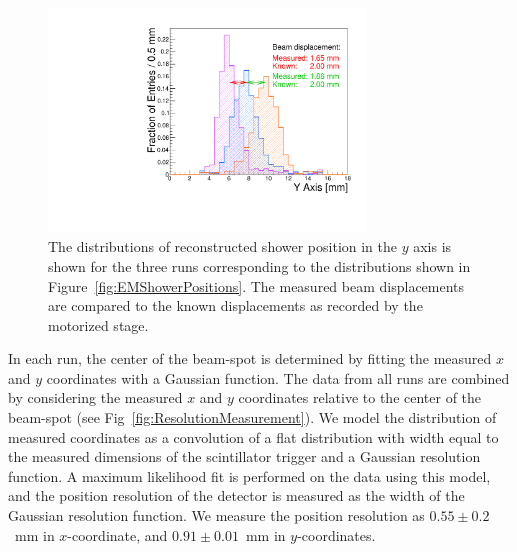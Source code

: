 \begin{figure}[h]
\includegraphics[width=0.75\textwidth]{Images/centers/superimposed.pdf}
\caption{The distributions of reconstructed shower position in the $y$ axis is
shown for the three runs corresponding to the distributions shown in
Figure~\ref{fig:EMShowerPositions}. The measured beam displacements are compared
to the known displacements as recorded by the motorized stage. }
\label{fig:EMShowerYPositionComparison} 
\end{figure} 
In each run, the center of the beam-spot is determined by fitting the measured
$x$ and $y$ coordinates with a Gaussian function. The data from all runs are
combined by considering the measured $x$ and $y$ coordinates relative to the
center of the beam-spot (see Fig~\ref{fig:ResolutionMeasurement}). We model the
distribution of measured coordinates as a convolution of a flat distribution
with width equal to the measured dimensions of the scintillator trigger and a
Gaussian resolution function. A maximum likelihood fit is performed on the data
using this model, and the position resolution of the detector is measured as the
width of the Gaussian resolution function. We measure the position resolution as
$0.55\pm0.2$~mm in $x$-coordinate, and $0.91\pm 0.01$~mm in $y$-coordinates.
